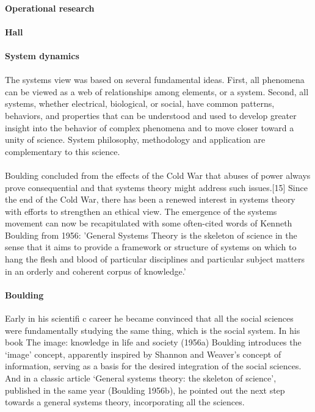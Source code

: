 \documentclass[a4paper,12pt,twoside]{report}
\begin{document}
{			\paragraph{Operational research}{
			}
			\paragraph{Hall}{
			}
			\paragraph{System dynamics}
			
			
			\paragraph{}{The systems view was based on several fundamental ideas. First, all phenomena can be viewed as a web of
relationships among elements, or a system. Second, all systems, whether electrical, biological, or social, have
common patterns, behaviors, and properties that can be understood and used to develop greater insight into the
behavior of complex phenomena and to move closer toward a unity of science. System philosophy, methodology and
application are complementary to this science.
			}
			\paragraph{}{Boulding concluded from the effects of the Cold War that abuses of power always
prove consequential and that systems theory might address such issues.[15] Since the end of the Cold War, there has
been a renewed interest in systems theory with efforts to strengthen an ethical view.
						The emergence of the systems movement can now be recapitulated
with some often-cited words of Kenneth Boulding from 1956:
'General Systems Theory is the skeleton of science in the sense
that it aims to provide a framework or structure of systems on
which to hang the flesh and blood of particular disciplines and
particular subject matters in an orderly and coherent corpus of
knowledge.'
			}
			\paragraph{Boulding}{Early in his scientifi c career he became convinced that all the social sciences
were fundamentally studying the same thing, which is the social system. In his book The
image: knowledge in life and society (1956a) Boulding introduces the ‘image’ concept,
apparently inspired by Shannon and Weaver’s concept of information, serving as a basis
for the desired integration of the social sciences. And in a classic article ‘General systems
theory: the skeleton of science’, published in the same year (Boulding 1956b), he pointed
out the next step towards a general systems theory, incorporating all the sciences. \cite[σελ. 455]{SystemsThinking:STRIJBOS2010}
			}
}
\end{document}
